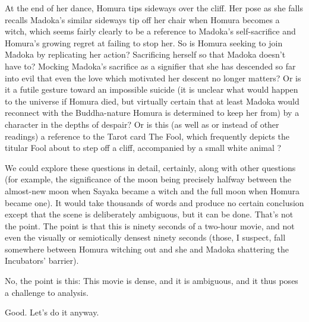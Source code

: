 At the end of her dance, Homura tips sideways over the cliff. Her pose as she falls recalls Madoka's similar sideways tip off her chair when Homura becomes a witch, which seems fairly clearly to be a reference to Madoka's self-sacrifice and Homura's growing regret at failing to stop her. So is Homura seeking to join Madoka by replicating her action? Sacrificing herself so that Madoka doesn't have to? Mocking Madoka's sacrifice as a signifier that she has descended so far into evil that even the love which motivated her descent no longer matters? Or is it a futile gesture toward an impossible suicide (it is unclear what would happen to the universe if Homura died, but virtually certain that at least Madoka would reconnect with the Buddha-nature Homura is determined to keep her from) by a character in the depths of despair? Or is this (as well as or instead of other readings) a reference to the Tarot card The Fool, which frequently depicts the titular Fool about to step off a cliff, accompanied by a small white animal \cite{ref115}? 

We could explore these questions in detail, certainly, along with other questions (for example, the significance of the moon being precisely halfway between the almost-new moon when Sayaka became a witch and the full moon when Homura became one). It would take thousands of words and produce no certain conclusion except that the scene is deliberately ambiguous, but it can be done. That's not the point. The point is that this is ninety seconds of a two-hour movie, and not even the visually or semiotically densest ninety seconds (those, I suspect, fall somewhere between Homura witching out and she and Madoka shattering the Incubators' barrier). 

No, the point is this: This movie is dense, and it is ambiguous, and it thus poses a challenge to analysis.

Good. Let's do it anyway.
